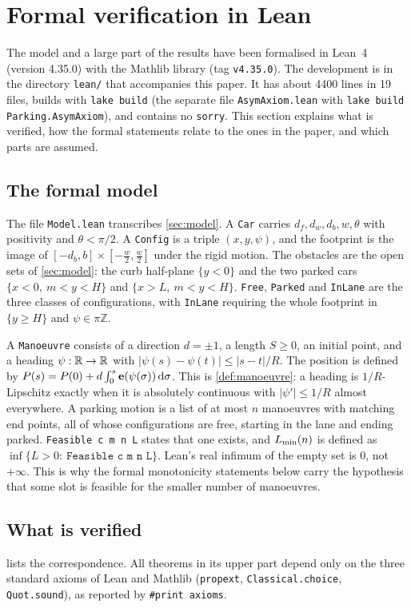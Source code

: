 \section{Formal verification in Lean}\label{sec:lean}

The model and a large part of the results have been formalised in Lean~4 (version 4.35.0) with the Mathlib library (tag \texttt{v4.35.0}).
The development is in the directory \texttt{lean/} that accompanies this paper.
It has about 4400 lines in 19 files, builds with \texttt{lake build} (the separate file \texttt{AsymAxiom.lean} with \texttt{lake build Parking.AsymAxiom}), and contains no \texttt{sorry}.
This section explains what is verified, how the formal statements relate to the ones in the paper, and which parts are assumed.

\subsection{The formal model}
The file \texttt{Model.lean} transcribes \cref{sec:model}.
A \texttt{Car} carries $d_f,d_w,d_b,w,\theta$ with positivity and $\theta<\pi/2$.
A \texttt{Config} is a triple $(x,y,\psi)$, and the footprint is the image of $[-d_b,b]\times[-\frac w2,\frac w2]$ under the rigid motion.
The obstacles are the open sets of \cref{sec:model}: the curb half-plane $\{y<0\}$ and the two parked cars $\{x<0,\ m<y<H\}$ and $\{x>L,\ m<y<H\}$.
\texttt{Free}, \texttt{Parked} and \texttt{InLane} are the three classes of configurations, with \texttt{InLane} requiring the whole footprint in $\{y\ge H\}$ and $\psi\in\pi\mathbb Z$.

A \texttt{Manoeuvre} consists of a direction $d=\pm1$, a length $S\ge0$, an initial point, and a heading $\psi:\mathbb{R}\to\mathbb{R}$ with $|\psi(s)-\psi(t)|\le|s-t|/R$.
The position is defined by $P(s)=P(0)+d\int_0^s\mathbf{e}(\psi(\sigma))\,\mathrm{d}\sigma$.
This is \cref{def:manoeuvre}: a heading is $1/R$-Lipschitz exactly when it is absolutely continuous with $|\psi'|\le1/R$ almost everywhere.
A parking motion is a list of at most $n$ manoeuvres with matching end points, all of whose configurations are free, starting in the lane and ending parked.
\texttt{Feasible c m n L} states that one exists, and $L_{\min}(n)$ is defined as $\inf\{L>0:\ \texttt{Feasible c m n L}\}$.
Lean's real infimum of the empty set is $0$, not $+\infty$.
This is why the formal monotonicity statements below carry the hypothesis that some slot is feasible for the smaller number of manoeuvres.

\subsection{What is verified}
 lists the correspondence.
All theorems in its upper part depend only on the three standard axioms of Lean and Mathlib (\texttt{propext}, \texttt{Classical.choice}, \texttt{Quot.sound}), as reported by \texttt{\#print axioms}.

